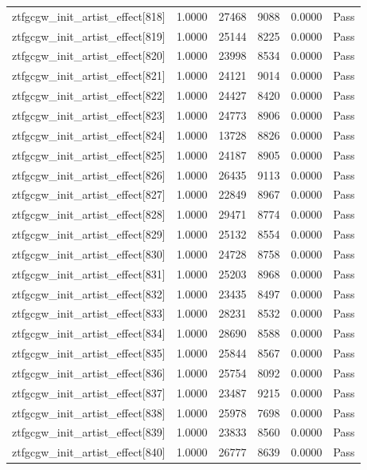 \begin{table}[htbp]
\begin{tabular}{llrrll}
ztfgcgw\_init\_artist\_effect[818] & 1.0000 & 27468 & 9088 & 0.0000 & Pass \\
ztfgcgw\_init\_artist\_effect[819] & 1.0000 & 25144 & 8225 & 0.0000 & Pass \\
ztfgcgw\_init\_artist\_effect[820] & 1.0000 & 23998 & 8534 & 0.0000 & Pass \\
ztfgcgw\_init\_artist\_effect[821] & 1.0000 & 24121 & 9014 & 0.0000 & Pass \\
ztfgcgw\_init\_artist\_effect[822] & 1.0000 & 24427 & 8420 & 0.0000 & Pass \\
ztfgcgw\_init\_artist\_effect[823] & 1.0000 & 24773 & 8906 & 0.0000 & Pass \\
ztfgcgw\_init\_artist\_effect[824] & 1.0000 & 13728 & 8826 & 0.0000 & Pass \\
ztfgcgw\_init\_artist\_effect[825] & 1.0000 & 24187 & 8905 & 0.0000 & Pass \\
ztfgcgw\_init\_artist\_effect[826] & 1.0000 & 26435 & 9113 & 0.0000 & Pass \\
ztfgcgw\_init\_artist\_effect[827] & 1.0000 & 22849 & 8967 & 0.0000 & Pass \\
ztfgcgw\_init\_artist\_effect[828] & 1.0000 & 29471 & 8774 & 0.0000 & Pass \\
ztfgcgw\_init\_artist\_effect[829] & 1.0000 & 25132 & 8554 & 0.0000 & Pass \\
ztfgcgw\_init\_artist\_effect[830] & 1.0000 & 24728 & 8758 & 0.0000 & Pass \\
ztfgcgw\_init\_artist\_effect[831] & 1.0000 & 25203 & 8968 & 0.0000 & Pass \\
ztfgcgw\_init\_artist\_effect[832] & 1.0000 & 23435 & 8497 & 0.0000 & Pass \\
ztfgcgw\_init\_artist\_effect[833] & 1.0000 & 28231 & 8532 & 0.0000 & Pass \\
ztfgcgw\_init\_artist\_effect[834] & 1.0000 & 28690 & 8588 & 0.0000 & Pass \\
ztfgcgw\_init\_artist\_effect[835] & 1.0000 & 25844 & 8567 & 0.0000 & Pass \\
ztfgcgw\_init\_artist\_effect[836] & 1.0000 & 25754 & 8092 & 0.0000 & Pass \\
ztfgcgw\_init\_artist\_effect[837] & 1.0000 & 23487 & 9215 & 0.0000 & Pass \\
ztfgcgw\_init\_artist\_effect[838] & 1.0000 & 25978 & 7698 & 0.0000 & Pass \\
ztfgcgw\_init\_artist\_effect[839] & 1.0000 & 23833 & 8560 & 0.0000 & Pass \\
ztfgcgw\_init\_artist\_effect[840] & 1.0000 & 26777 & 8639 & 0.0000 & Pass \\

\end{tabular}
\end{table}
